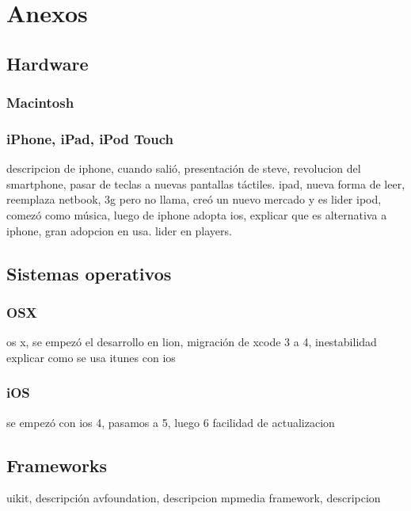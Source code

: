	
\chapter{Anexos}
	\section{Hardware}
		\subsection{Macintosh}

		\subsection{iPhone, iPad, iPod Touch}
		descripcion de iphone, cuando salió, presentación de steve, revolucion del smartphone, pasar de teclas a nuevas pantallas táctiles.
		ipad, nueva forma de leer, reemplaza netbook, 3g pero no llama, creó un nuevo mercado y es lider
		ipod, comezó como música, luego de iphone adopta ios, explicar que es alternativa a iphone, gran adopcion en usa.  lider en players.
	\section{Sistemas operativos}
		\subsection{OSX}
		os x, se empezó el desarrollo en lion, migración de xcode 3 a 4, inestabilidad
		explicar como se usa  itunes con ios
		\subsection{iOS}
		se empezó con ios 4, pasamos a 5, luego 6		
		facilidad de actualizacion
	\section{Frameworks}
	uikit, descripción 
	avfoundation, descripcion
	mpmedia framework, descripcion
	
